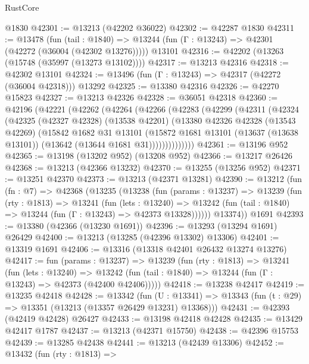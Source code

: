 \begin{lexlean}{RustCore}
\begin{coremodule}
    @1830
@42301 := @13213 (@42202 @36022)
@42302 := @42287 @1830
@42311 := @13478
    (fun (tail : @1840) => @13244 (fun (Γ : @13243) => @42301 (@42272 (@36004 (@42302 @13276)))))
    @13101
@42316 := @42202 (@13263 (@15748 (@35997 (@13273 @13102))))
@42317 := @13213 @42316
@42318 := @42302 @13101
@42324 := @13496 (fun (Γ : @13243) => @42317 (@42272 (@36004 @42318))) @13292
@42325 := @13380 @42316
@42326 := @42270 @15823
@42327 := @13213 @42326
@42328 := @36051 @42318
@42360 := @42196
    (@42221
      (@42262
        (@42264
          (@42266
            (@42283
              (@42299
                (@42311
                  (@42324
                    (@42325
                      (@42327 @42328)
                      (@13538 @42201)
                      (@13380
                        @42326
                        @42328
                        (@13543 @42269)
                        (@15842
                          @1682
                          @31
                          @13101
                          (@15872
                            @1681
                            @13101
                            (@13637 (@13638 @13101))
                            (@13642 (@13644 @1681 @31))))))))))))))
@42361 := @13196 @952
@42365 := @13198 (@13202 @952) (@13208 @952)
@42366 := @13217 @26426
@42368 := @13213 (@42366 @13232)
@42370 := @13255 (@13256 @952)
@42371 := @13251 @42370
@42373 := @13213 (@42371 @13281)
@42390 := @13212
    (fun (fn : @7) =>
    @42368
      (@13235
        (@13238
          (fun (params : @13237) =>
          @13239
            (fun (rty : @1813) =>
            @13241
              (fun (lets : @13240) =>
              @13242 (fun (tail : @1840) => @13244 (fun (Γ : @13243) => @42373 @13328))))))
        @13374))
    @1691
@42393 := @13380 (@42366 (@13230 @1691))
@42396 := @13293 (@13294 @1691) @26429
@42400 := @13213 (@13285 (@42396 @13302) @13306)
@42401 := @13319 @1691
@42406 := @13316 (@13318 @42401 @26432 @13274 @13276)
@42417 := fun (params : @13237) =>
  @13239
    (fun (rty : @1813) =>
    @13241
      (fun (lets : @13240) =>
      @13242 (fun (tail : @1840) => @13244 (fun (Γ : @13243) => @42373 (@42400 @42406)))))
@42418 := @13238 @42417
@42419 := @13235 @42418
@42428 := @13342
    (fun (U : @13341) => @13343 (fun (t : @29) => @13351 (@13213 (@13357 @26429 @13231) @13368)))
@42431 := @42393 (@42419 @42428) @26427
@42433 := @13198 @42418 @42428
@42435 := @13429 @42417 @1787
@42437 := @13213 (@42371 @15750)
@42438 := @42396 @15753
@42439 := @13285 @42438
@42441 := @13213 (@42439 @13306)
@42452 := @13432
    (fun (rty : @1813) =>

\end{coremodule}
\end{lexlean}
